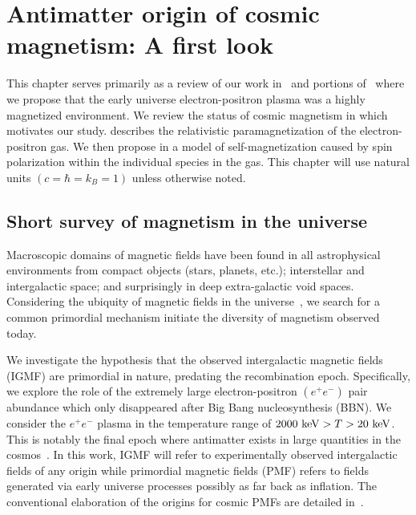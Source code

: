 \chapter{Antimatter origin of cosmic magnetism: A first look}
\label{chap:cosmo}
\noindent This chapter serves primarily as a review of our work in~\cite{Steinmetz:2023} and portions of~\cite{Rafelski:2023emw} where we propose that the early universe electron-positron plasma was a highly magnetized environment. We review the status of cosmic magnetism in  which motivates our study.  describes the relativistic paramagnetization of the electron-positron gas. We then propose in  a model of self-magnetization caused by spin polarization within the individual species in the gas. This chapter will use natural units $(c=\hbar=k_{B}=1)$ unless otherwise noted.

\section{Short survey of magnetism in the universe}
\label{sec:universe}
\noindent Macroscopic domains of magnetic fields have been found in all astrophysical environments from compact objects (stars, planets, etc.); interstellar and intergalactic space; and surprisingly in deep extra-galactic void spaces. Considering the ubiquity of magnetic fields in the universe~\citep{Giovannini:2017rbc,Giovannini:2003yn,Kronberg:1993vk}, we search for a common primordial mechanism initiate the diversity of magnetism observed today.

We investigate the hypothesis that the observed intergalactic magnetic fields (IGMF) are primordial in nature, predating the recombination epoch. Specifically, we explore the role of the extremely large electron-positron $(e^{+}e^{-})$ pair abundance which only disappeared after Big Bang nucleosynthesis (BBN). We consider the $e^{+}e^{-}$ plasma in the temperature range of $2000\text{ keV}>T>20\text{ keV}$. This is notably the final epoch where antimatter exists in large quantities in the cosmos~\citep{Rafelski:2023emw}. In this work, IGMF will refer to experimentally observed intergalactic fields of any origin while primordial magnetic fields (PMF) refers to fields generated via early universe processes possibly as far back as inflation. The conventional elaboration of the origins for cosmic PMFs are detailed in~\citep{Gaensler:2004gk,Durrer:2013pga,AlvesBatista:2021sln}.

